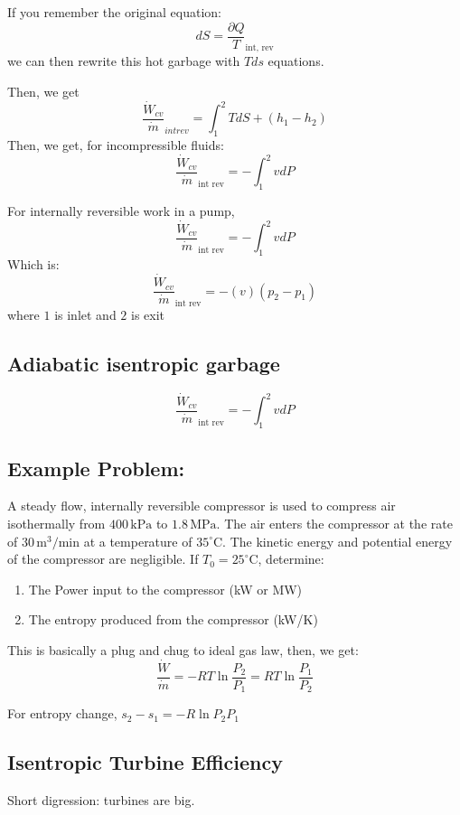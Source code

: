 \documentclass{article}
\begin{document}
If you remember the original equation:
\[dS = \frac{\partial Q}{T}_\text{int, rev}\]  
we can then rewrite this hot garbage with $Tds$ equations.

Then, we get 
\[\frac{\dot W_{cv}}{\dot m}_{int rev} = \int_1^2 {T dS} + (h_1 - h_2) \]
Then, we get, for incompressible fluids:
\[\frac{\dot W_{cv}}{\dot m}_{\text{int rev}} = - \int_1^2 {v dP} \]

For internally reversible work in a pump, 
\[\frac{\dot W_{cv}}{\dot m}_{\text{int rev}} = - \int_1^2 {v dP} \]
Which is:
\[\frac{\dot W_{cv}}{\dot m}_{\text{int rev}} = -{(v)(p_2 - p_1)} \]
where $1$ is inlet and $2$ is exit

\subsection{Adiabatic isentropic garbage}
\[\frac{\dot W_{cv}}{\dot m}_{\text{int rev}} = - \int_1^2 {v dP} \]


\subsection{Example Problem:}
\begin{proposition}[Question 6]
A steady flow, internally reversible compressor is used to compress air isothermally from \( 400 \, \text{kPa} \) to \( 1.8 \, \text{MPa} \). The air enters the compressor at the rate of \( 30 \, \text{m}^3/\text{min} \) at a temperature of \( 35^\circ\text{C} \). The kinetic energy and potential energy of the compressor are negligible. If \( T_0 = 25^\circ\text{C} \), determine:
\begin{enumerate}
    \item The Power input to the compressor (kW or MW)
    \item The entropy produced from the compressor (kW/K)
\end{enumerate}
\end{proposition}

This is basically a plug and chug to ideal gas law, then, we get:
\[\frac{\dot W}{\dot m} = -RT \ln{\frac{P_2}{P_1}} = RT \ln{\frac{P_1}{P_2}}\]

For entropy change, $s_2 - s_1 = -R \ln{{P_2}{P_1}}$

\subsection{Isentropic Turbine Efficiency}
Short digression: turbines are big. 
\end{document}
